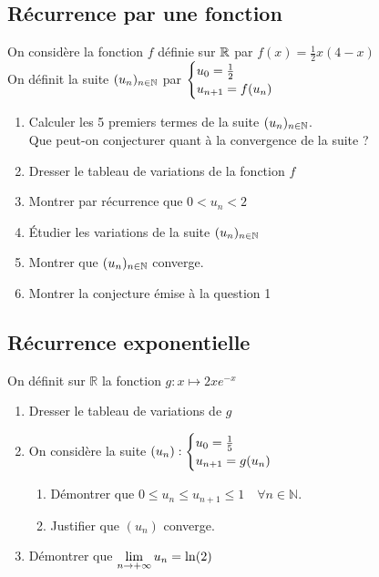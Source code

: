 \documentclass[oneside,12pt]{book}          %
\begin{document}
\subsection{Récurrence par une fonction}
On considère la fonction $f$ définie sur ${\mathbb R}$ par $f(x)=\frac{1}{2}x(4-x)$ \\
On définit la suite ${(u_{n})_{n\in\mathbb N}}$ par $\defsuite{u_0=\frac{1}{2}}{f(u_n)}$
\begin{enumerate}
    \item Calculer les 5 premiers termes de la suite ${(u_{n})_{n\in\mathbb N}}$.\\
    Que peut-on conjecturer quant à la convergence de la suite ?
    \item Dresser le tableau de variations de la fonction $f$
    \item Montrer par récurrence que $0< u_n< 2$
    \item Étudier les variations de la suite ${(u_{n})_{n\in\mathbb N}}$
    \item Montrer que ${(u_{n})_{n\in\mathbb N}}$ converge.
    \item Montrer la conjecture émise à la question 1
\end{enumerate}



\subsection{Récurrence exponentielle}
On définit sur $\mathbb{R}$ la fonction $g : x \mapsto 2xe^{-x}$
\begin{enumerate}
    \item Dresser le tableau de variations de $g$
    \item On considère la suite $(u_n) : \defsuite{u_0=\frac{1}{5}}{g(u_n)}$
    \begin{enumerate}
        \item Démontrer que $0 \leq u_n \leq u_{n+1} \leq 1 \quad \forall n \in \mathbb{N}$.
        \item Justifier que $(u_n)$ converge.
    \end{enumerate}
    \item Démontrer que ${\lim\limits_{n\to +\infty}}\, u_n = \ln(2)$
\end{enumerate}
\end{document}
